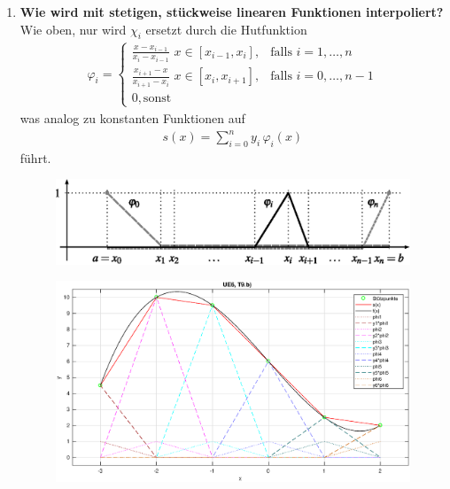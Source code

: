 \begin{enumerate}
		\item \textbf{Wie wird mit stetigen, stückweise linearen Funktionen interpoliert?} \\
			Wie oben, nur wird \(\chi_i\) ersetzt durch die Hutfunktion
			\begin{align*}
				\varphi_i=\begin{cases}
					\frac{x-x_{i-1}}{x_i-x_{i-1}}\,\,x\in[x_{i-1},x_i], & \text{falls } i=1,\dots,n \\
					\frac{x_{i+1}-x}{x_{i+1}-x_i}\,\,x\in[x_i,x_{i+1}], & \text{falls } i=0,\dots,n-1 \\
					0, \text{sonst}
				\end{cases}
			\end{align*}
			was analog zu konstanten Funktionen auf
			\begin{align*}
				s(x)=\sum_{i=0}^{n} y_i\,\varphi_i(x)
			\end{align*}
			führt.
			\begin{figure}[htbp]
				\centering
				\includegraphics[width=0.6\linewidth]{Kap3_3}
			\end{figure}
				\begin{figure}[htbp]
				\centering
				\includegraphics[width=1.0\textwidth]{T9b}
			\end{figure}
		
		\pagebreak
		

\end{enumerate}
